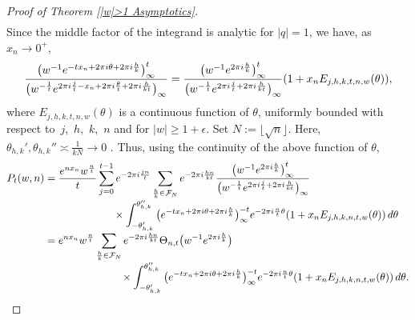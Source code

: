 \documentclass[11pt]{article}
\numberwithin{equation}{section}
\begin{document}
\begin{proof}[Proof of Theorem \ref{|w|>1 Asymptotics}]
\begin{align*}
 \end{align*}
 Since the middle factor of the integrand is analytic for $|q|=1$, we have, as $x_n \to 0^+$,
 \begin{align}
 \frac{\big(w^{-1}{\rm e}^{-tx_n+2\pi {\rm i} \theta+2\pi {\rm i} \frac{h}{k}}\big)_{\infty}^t}{\big(w^{-\frac{1}{t}}{\rm e}^{2\pi {\rm i} \frac{j}{t}-x_n+2\pi {\rm i} \frac{\theta}{t}+2\pi {\rm i} \frac{h}{kt}}\big)_{\infty}} =\frac{\big(w^{-1}{\rm e}^{2\pi {\rm i} \frac{h}{k}}\big)_{\infty}^t}{\big(w^{-\frac{1}{t}}{\rm e}^{2\pi {\rm i} \frac{j}{t}+2\pi {\rm i} \frac{h}{kt}}\big)_{\infty}}(1+x_n E_{j,h,k,t,n,w}(\theta)), \label{E:Ejhktw}
 \end{align}
 where $E_{j,h,k,t,n,w}(\theta)$ is a continuous function of $\theta$, uniformly bounded with respect to~$j$,~$h$,~$k$,~$n$ and for $|w|\geq 1+\epsilon$. Set $N:=\lfloor \sqrt{n} \rfloor$.
 Here, $\theta_{h,k}',\theta_{h,k}'' \asymp \frac{1}{kN} \to 0$ \cite[p.~75]{Andrews}. Thus, using the continuity of the above function of $\theta$,
 \begin{align*}
 P_t(w,n)
 &{}=\frac{{\rm e}^{nx_n}w^{\frac{n}{t}}}{t}\sum_{j=0}^{ t-1}{\rm e}^{-2\pi {\rm i} \frac{jn}{t}} \sum_{\frac{h}{k} \in \mathcal{F}_N} {\rm e}^{-2\pi {\rm i} \frac{hn}{kt}}\frac{\big(w^{-1}{\rm e}^{2\pi {\rm i} \frac{h}{k}}\big)_{\infty}^t}{\big(w^{-\frac{1}{t}}{\rm e}^{2\pi {\rm i} \frac{j}{t}+2\pi {\rm i} \frac{h}{kt}}\big)_{\infty}} \\[-1mm]
 &\hphantom{=\frac{{\rm e}^{nx_n}w^{\frac{n}{t}}}{t}\sum_{j=0}^{ t-1}}\,{} \times \int_{-\theta_{h,k}'}^{\theta_{h,k}''} \big({\rm e}^{-tx_n+2\pi {\rm i} \theta+2\pi {\rm i} \frac{h}{k}}\big)_{\infty}^{-t}{\rm e}^{-2\pi {\rm i} \frac{n}{t} \theta}(1+x_n E_{j,h,k,n,t,w}(\theta)) \,{\rm d}\theta \\[-1mm]
 &{}={\rm e}^{nx_n}w^{\frac{n}{t}} \sum_{\frac{h}{k} \in \mathcal{F}_N} {\rm e}^{-2\pi {\rm i} \frac{hn}{kt}}\Theta_{n,t}\big(w^{-1}{\rm e}^{2\pi {\rm i} \frac{h}{k}}\big) \\[-1mm]
 &\hphantom{={\rm e}^{nx_n}w^{\frac{n}{t}} \sum_{\frac{h}{k} \in \mathcal{F}_N}}\,{} \times \int_{-\theta_{h,k}'}^{\theta_{h,k}''} \big({\rm e}^{-tx_n+2\pi {\rm i} \theta+2\pi {\rm i} \frac{h}{k}}\big)_{\infty}^{-t}{\rm e}^{-2\pi {\rm i} \frac{n}{t} \theta}(1+x_n E_{j,h,k,n,t,w}(\theta)) \,{\rm d}\theta.
 \end{align*}


\end{proof}
\end{document}
